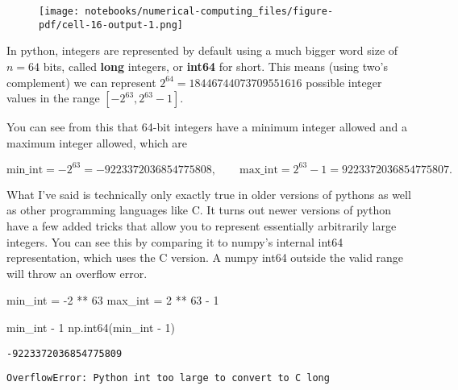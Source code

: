 \documentclass[
  letterpaper,
  DIV=11,
  numbers=noendperiod]{scrreprt}
\newenvironment{Shaded}{\begin{snugshade}}{\end{snugshade}}
\newcommand{\DecValTok}[1]{\textcolor[rgb]{0.68,0.00,0.00}{#1}}
\newcommand{\NormalTok}[1]{\textcolor[rgb]{0.00,0.23,0.31}{#1}}
\newcommand{\OperatorTok}[1]{\textcolor[rgb]{0.37,0.37,0.37}{#1}}
\begin{document}
\begin{figure}[H]

{\centering \texttt{[image: notebooks/numerical-computing\_files/figure-pdf/cell-16-output-1.png]}

}

\end{figure}

In python, integers are represented by default using a much bigger word
size of \(n=64\) bits, called \textbf{long} integers, or \textbf{int64}
for short. This means (using two's complement) we can represent
\(2^{64}=18446744073709551616\) possible integer values in the range
\([-2^{63}, 2^{63}-1]\).

You can see from this that 64-bit integers have a minimum integer
allowed and a maximum integer allowed, which are

\[\text{min\_int}=-2^{63}=-9223372036854775808, \qquad \text{max\_int}=2^{63}-1=9223372036854775807.\]

What I've said is technically only exactly true in older versions of
pythons as well as other programming languages like C. It turns out
newer versions of python have a few added tricks that allow you to
represent essentially arbitrarily large integers. You can see this by
comparing it to numpy's internal int64 representation, which uses the C
version. A numpy int64 outside the valid range will throw an overflow
error.

\begin{Shaded}
\begin{Highlighting}[]
\NormalTok{min\_int }\OperatorTok{=} \OperatorTok{{-}}\DecValTok{2} \OperatorTok{**} \DecValTok{63}
\NormalTok{max\_int }\OperatorTok{=} \DecValTok{2} \OperatorTok{**} \DecValTok{63} \OperatorTok{{-}} \DecValTok{1}
\end{Highlighting}
\end{Shaded}

\begin{Shaded}
\begin{Highlighting}[]
\NormalTok{min\_int }\OperatorTok{{-}} \DecValTok{1}
\NormalTok{np.int64(min\_int }\OperatorTok{{-}} \DecValTok{1}\NormalTok{)}
\end{Highlighting}
\end{Shaded}

\begin{verbatim}
-9223372036854775809
\end{verbatim}

\begin{verbatim}
OverflowError: Python int too large to convert to C long
\end{verbatim}
\end{document}
